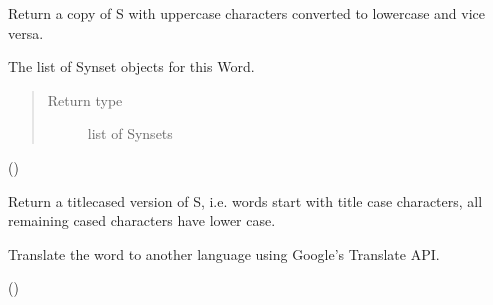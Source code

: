 \documentclass[letterpaper,10pt,english]{sphinxmanual}
\begin{document}
\begin{fulllineitems}
\begin{fulllineitems}
\end{fulllineitems}


\begin{fulllineitems}
\label{api_reference:textblob_de.blob.Word.swapcase}
Return a copy of S with uppercase characters converted to lowercase
and vice versa.

\end{fulllineitems}


\begin{fulllineitems}
\label{api_reference:textblob_de.blob.Word.synsets}
The list of Synset objects for this Word.
\begin{quote}\begin{description}
\item[{Return type}] \leavevmode
list of Synsets

\end{description}\end{quote}

()

\end{fulllineitems}


\begin{fulllineitems}
\label{api_reference:textblob_de.blob.Word.title}
Return a titlecased version of S, i.e. words start with title case
characters, all remaining cased characters have lower case.

\end{fulllineitems}


\begin{fulllineitems}
\label{api_reference:textblob_de.blob.Word.translate}
Translate the word to another language using Google's Translate API.

()

\end{fulllineitems}


\end{fulllineitems}
\end{document}
